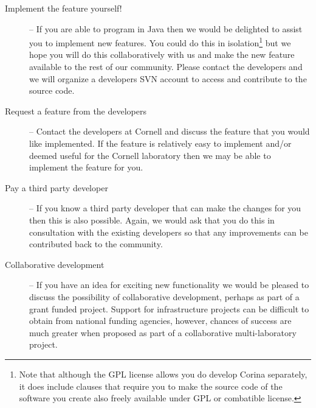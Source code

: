 \begin{description}
 \item[Implement the feature yourself!] -- If you are able to program in Java then we would be delighted to assist you to implement new features.  You could do this in isolation\footnote{Note that although the GPL license allows you do develop Corina separately, it does include clauses that require you to make the source code of the software you create also freely available under GPL or combatible license.} but we hope you will do this collaboratively with us and make the new feature available to the rest of our community.  Please contact the developers and we will organize a developers SVN account to access and contribute to the source code.
 \item[Request a feature from the developers] -- Contact the developers at Cornell and discuss the feature that you would like implemented.  If the feature is relatively easy to implement and/or deemed useful for the Cornell laboratory then we may be able to implement the feature for you.
 \item[Pay a third party developer] -- If you know a third party developer that can make the changes for you then this is also possible.  Again, we would ask that you do this in consultation with the existing developers so that any improvements can be contributed back to the community.
 \item[Collaborative development] -- If you have an idea for exciting new functionality we would be pleased to discuss the possibility of collaborative development, perhaps as part of a grant funded project.  Support for infrastructure projects can be difficult to obtain from national funding agencies, however, chances of success are much greater when proposed as part of a collaborative multi-laboratory project.
\end{description}


